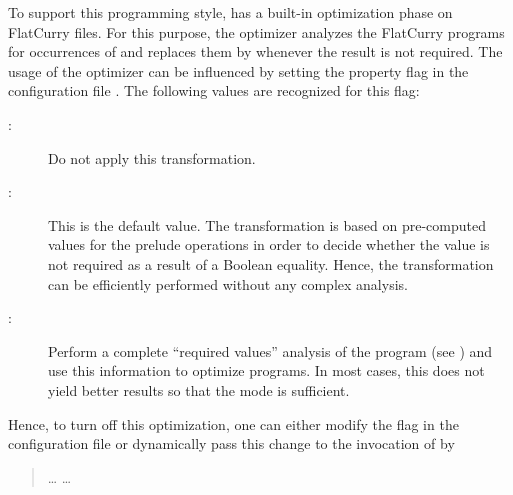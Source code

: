 To support this programming style, \CYS has a built-in optimization phase
on FlatCurry files. For this purpose, the optimizer analyzes
the FlatCurry programs for occurrences of \ccode{==}
and replaces them by \ccode{=:=} whenever the result 
is not required.
The usage of the optimizer can be influenced by setting
the property flag  in the
configuration file \code{\curryrc}.
The following values are recognized for this flag:
\begin{description}
\item[:] Do not apply this transformation.
\item[:] This is the default value.
The transformation is based on pre-computed values for
the prelude operations in order to decide whether the
value  is not required as a result of a Boolean equality.
Hence, the transformation can be efficiently performed
without any complex analysis.
\item[:] Perform a complete ``required values'' analysis
of the program (see \cite{AntoyHanus15LOPSTR})
and use this information to optimize programs.
In most cases, this does not yield better results so that
the  mode is sufficient.
\end{description}
%
Hence, to turn off this optimization, one can either modify
the flag  in the
configuration file \code{\curryrc} or dynamically pass this change
to the invocation of \CYS by
\begin{quote}
\ldots{}  \ldots
\end{quote}
